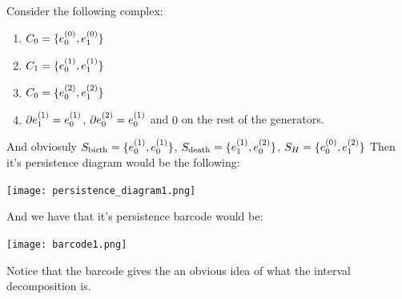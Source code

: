 \begin{example}


%
%
%
%
%


Consider the following complex:

\begin{enumerate}

\item $C_0 = \{e_{0}^{(0)},e_{1}^{(0)}\}$

\item $C_1 = \{e_{0}^{(1)},e_{1}^{(1)}\}$

\item $C_0 = \{e_{0}^{(2)},e_{1}^{(2)}\}$

\item $\partial e_{1}^{(1)}=e_{0}^{(1)}$, $\partial e_{0}^{(2)}=e_{0}^{(1)}$ and 
$0$ on the rest of the generators.
\end{enumerate}

And obviosuly $S_{\text{birth}}=\{
e_{0}^{(1)},
e_{0}^{(1)}
\}$,
$S_{\text{death}}=\{
e_{1}^{(1)},
e_{0}^{(2)}
\}$,
$
S_H=\{
e_{0}^{(0)},
e_{1}^{(2)}
\}
$
Then it's persistence diagram would be the following:

\begin{center}
\texttt{[image: persistence\_diagram1.png]}
\end{center}

And we have that it's persistence barcode would be:


\begin{center}
\texttt{[image: barcode1.png]}
\end{center}


\end{example}


Notice that the barcode gives the an obvious idea of
what the interval decomposition is.






